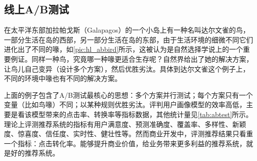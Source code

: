   \subsection{线上A/B测试}
  在太平洋东部加拉帕戈斯（Galapagos）的一个小岛上有一种名叫达尔文雀的鸟，一部分生活在岛的西部，另一部分生活在岛的东部，由于生活环境的细微不同它们进化出了不同的喙，如\autoref{pic:hl_abbird}所示，这被认为是自然选择学说上的一个重要例证。同样一种鸟，究竟哪一种喙更适合生存呢？自然界给出了她的解决方案，让鸟儿自己变异（设计多个方案），然后优胜劣汰。具体到达尔文雀这个例子上，不同的环境中喙也有不同的解决方案。
  \begin{figure}
  \centering
    \label{pic:hl_abbird}
  \end{figure}
  上面的例子包含了A/B测试最核心的思想：多个方案并行测试；每个方案只有一个变量（比如鸟喙）不同；以某种规则优胜劣汰。评判用户画像模型的效率高低，主要是看该模型带来的点击率、转换率等指标数据，其他统计量见\autoref{tab:abtest}所示。理论上评测推荐系统的指标有用户满意度、预测准确度、覆盖率、多样性、新颖度、惊喜度、信任度、实时性、健壮性等。然而商业开发中，评测推荐结果只看重一个指标：点击转化率。能够提升商业价值，给业务带来更多利益的推荐系统，就是好的推荐系统。

